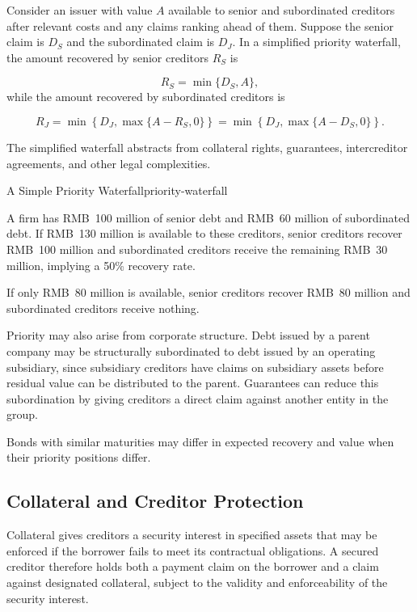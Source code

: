 Consider an issuer with value $A$ available to senior and subordinated creditors after relevant costs and any claims ranking ahead of them. Suppose the senior claim is $D_S$ and the subordinated claim is $D_J$. In a simplified priority waterfall, the amount recovered by senior creditors $R_S$ is

\begin{equation}
R_S=\min\{D_S,A\},
\label{eq:ch8-senior-recovery}
\end{equation}
while the amount recovered by subordinated creditors is

\begin{equation}
R_J
=
\min\left\{D_J,\max\{A-R_S,0\}\right\}
=
\min\left\{D_J,\max\{A-D_S,0\}\right\}.
\label{eq:ch8-junior-recovery}
\end{equation}

The simplified waterfall abstracts from collateral rights, guarantees, intercreditor agreements, and other legal complexities.

\begin{example}{A Simple Priority Waterfall}{priority-waterfall}

A firm has RMB~100 million of senior debt and RMB~60 million of subordinated debt. If RMB~130 million is available to these creditors, senior creditors recover RMB~100 million and subordinated creditors receive the remaining RMB~30 million, implying a 50\% recovery rate.

If only RMB~80 million is available, senior creditors recover RMB~80 million and subordinated creditors receive nothing.

\end{example}

Priority may also arise from corporate structure. Debt issued by a parent company may be structurally subordinated to debt issued by an operating subsidiary, since subsidiary creditors have claims on subsidiary assets before residual value can be distributed to the parent. Guarantees can reduce this subordination by giving creditors a direct claim against another entity in the group.

Bonds with similar maturities may differ in expected recovery and value when their priority positions differ.

\subsection{Collateral and Creditor Protection}

Collateral gives creditors a security interest in specified assets that may be enforced if the borrower fails to meet its contractual obligations. A secured creditor therefore holds both a payment claim on the borrower and a claim against designated collateral, subject to the validity and enforceability of the security interest.

